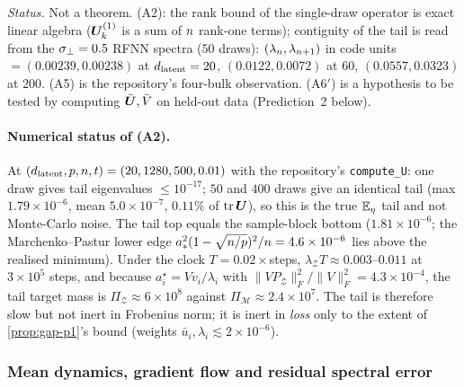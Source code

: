 \noindent\emph{Status.} Not a theorem. (A2): the rank bound of the single-draw operator is exact linear algebra ($\bm{U}^{(1)}_k$ is a sum of $n$ rank-one terms); contiguity of the tail is read from the $\sigma_{\perp}=0.5$ RFNN spectra ($50$ draws): $(\lambda_{n},\lambda_{n+1})$ in code units $=(0.00239,0.00238)$ at $d_{\mathrm{latent}}=20$, $(0.0122,0.0072)$ at $60$, $(0.0557,0.0323)$ at $200$. (A5) is the repository's four-bulk observation. (A6$'$) is a hypothesis to be tested by computing $\bar{\bm{U}},\bar V$ on held-out data (Prediction~2 below).

\paragraph{Numerical status of (A2).}
At $(d_{\mathrm{latent}},p,n,t)=(20,1280,500,0.01)$ with the repository's \texttt{compute\_U}: one draw gives tail eigenvalues $\le10^{-17}$; $50$ and $400$ draws give an identical tail (max $1.79\times10^{-6}$, mean $5.0\times10^{-7}$, $0.11\%$ of $\operatorname{tr}\bm{U}$), so this is the true $\mathbb{E}_\eta$ tail and not Monte-Carlo noise. The tail top equals the sample-block bottom ($1.81\times10^{-6}$; the Marchenko--Pastur lower edge $a_*^2(1-\sqrt{n/p})^2/n=4.6\times10^{-6}$ lies above the realised minimum). Under the clock $T=0.02\times$steps, $\lambda_{\mathcal Z}T\approx0.003\text{--}0.011$ at $3\times10^5$ steps, and because $a_i^\star=Vv_i/\lambda_i$ with $\|VP_{\mathcal Z}\|_F^2/\|V\|_F^2=4.3\times10^{-4}$, the tail target mass is $\Pi_{\mathcal Z}\approx6\times10^8$ against $\Pi_{\mathcal M}\approx2.4\times10^7$. The tail is therefore slow but not inert in Frobenius norm; it is inert in \emph{loss} only to the extent of \cref{prop:gap-p1}'s bound (weights $\bar u_i,\lambda_i\lesssim2\times10^{-6}$).

\subsubsection{Mean dynamics, gradient flow and residual spectral error}

